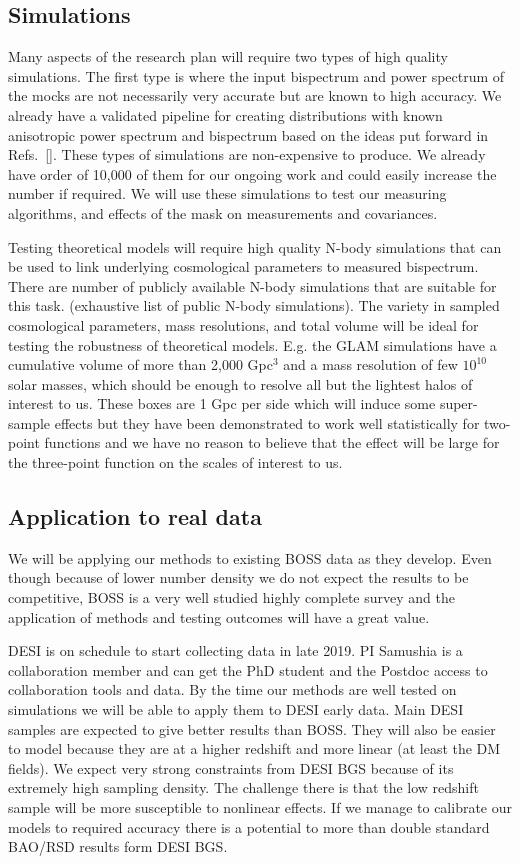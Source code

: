 \subsection*{Simulations}

Many aspects of the research plan will require two types of high quality
simulations. The first type is where the input bispectrum and power spectrum of
the mocks are not necessarily very accurate but are known to high accuracy. We
already have a validated pipeline for creating distributions with known
anisotropic power spectrum and bispectrum based on the ideas put forward in
Refs.~[]. These types of simulations are non-expensive to produce. We already
have order of 10,000 of them for our ongoing work and could easily increase the
number if required. We will use these simulations to test our measuring
algorithms, and effects of the mask on measurements and covariances. 

Testing theoretical models will require high quality N-body simulations that
can be used to link underlying cosmological parameters to measured bispectrum.
There are number of publicly available N-body simulations that are suitable for
this task. (exhaustive list of public N-body simulations). The variety in
sampled cosmological parameters, mass resolutions, and total volume will be
ideal for testing the robustness of theoretical models.  E.g. the GLAM
simulations have a cumulative volume of more than 2,000 Gpc$^3$ and a mass
resolution of few $10^{10}$ solar masses, which should be enough to resolve
all but the lightest halos of interest to us. These boxes are 1 Gpc per side
which will induce some super-sample effects but they have been demonstrated to
work well statistically for two-point functions and we have no reason to
believe that the effect will be large for the three-point function on the
scales of interest to us.

\subsection*{Application to real data}

We will be applying our methods to existing BOSS data as they develop. Even
though because of lower number density we do not expect the results to be
competitive, BOSS is a very well studied highly complete survey and the
application of methods and testing outcomes will have a great value. 

DESI is on schedule to start collecting data in late 2019. PI Samushia is a
collaboration member and can get the PhD student and the Postdoc access to
collaboration tools and data. By the time our methods are well tested on
simulations we will be able to apply them to DESI early data. Main DESI samples
are expected to give better results than BOSS. They will also be easier to
model because they are at a higher redshift and more linear (at least the DM
fields). We expect very strong constraints from DESI BGS because of its
extremely high sampling density. The challenge there is that the low redshift
sample will be more susceptible to nonlinear effects. If we manage to calibrate
our models to required accuracy there is a potential to more than double
standard BAO/RSD results form DESI BGS.

